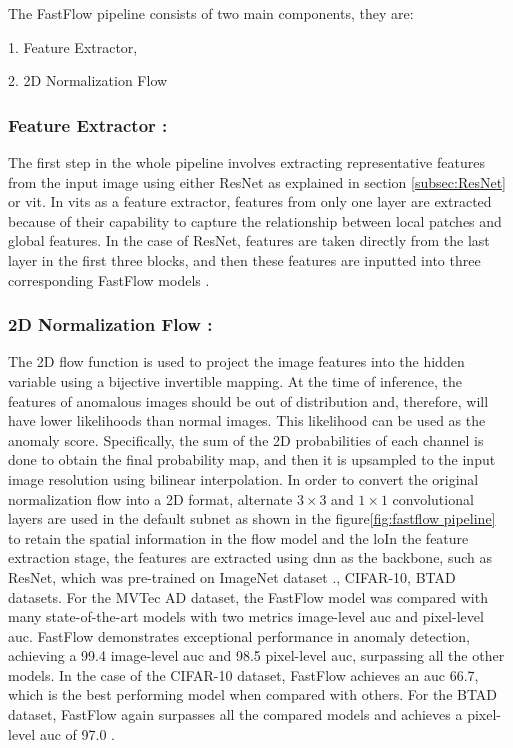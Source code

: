 The FastFlow pipeline consists of two main components, they are:

1. Feature Extractor,

2. 2D Normalization Flow

\subsubsection*{Feature Extractor :}

The first step in the whole pipeline involves extracting representative features from the input image using either ResNet as explained in section \ref{subsec:ResNet} or \gls{vit}. In \glspl{vit} as a feature extractor, features from only one layer are extracted because of their capability to capture the relationship between local patches and global features. In the case of ResNet, features are taken directly from the last layer in the first three blocks, and then these features are inputted into three corresponding FastFlow models \cite{yu2021fastflowunsupervisedanomalydetection}. 

\subsubsection*{2D Normalization Flow :}

The 2D flow function is used to project the image features into the hidden variable using a bijective invertible mapping. At the time of inference, the features of anomalous images should be out of distribution and, therefore, will have lower likelihoods than normal images. This likelihood can be used as the anomaly score. Specifically, the sum of the 2D probabilities of each channel is done to obtain the final probability map, and then it is upsampled to the input image resolution using bilinear interpolation. In order to convert the original normalization flow into a 2D format, alternate $3\times3$ and $1\times1$ convolutional layers are used in the default subnet as shown in the figure\ref{fig:fastflow pipeline} to retain the spatial information in the flow model and the loIn the feature extraction stage, the features are extracted using \gls{dnn} as the backbone, such as ResNet, which was pre-trained on ImageNet\cite{5206848} dataset \cite{10208786}., CIFAR-10\cite{krizhevsky2009learning}, BTAD\cite{Mishra_2021} datasets. For the MVTec AD dataset, the FastFlow model was compared with many state-of-the-art models with two metrics image-level \gls{auc} and pixel-level \gls{auc}. FastFlow demonstrates exceptional performance in anomaly detection, achieving a 99.4 image-level \gls{auc} and 98.5 pixel-level \gls{auc}, surpassing all the other models. In the case of the CIFAR-10 dataset, FastFlow achieves an \gls{auc} 66.7, which is the best performing model when compared with others. For the BTAD dataset, FastFlow again surpasses all the compared models and achieves a pixel-level \gls{auc} of 97.0 \cite{yu2021fastflowunsupervisedanomalydetection}.

